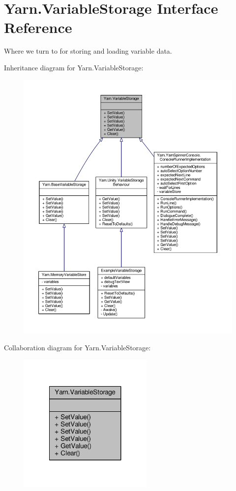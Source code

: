 \hypertarget{a00169}{\section{Yarn.\-Variable\-Storage Interface Reference}
\label{a00169}
}


Where we turn to for storing and loading variable data.  




Inheritance diagram for Yarn.\-Variable\-Storage\-:
\nopagebreak
\begin{figure}[H]
\begin{center}
\leavevmode
\includegraphics[width=350pt]{a00579}
\end{center}
\end{figure}


Collaboration diagram for Yarn.\-Variable\-Storage\-:
\nopagebreak
\begin{figure}[H]
\begin{center}
\leavevmode
\includegraphics[width=188pt]{a00580}
\end{center}
\end{figure}
